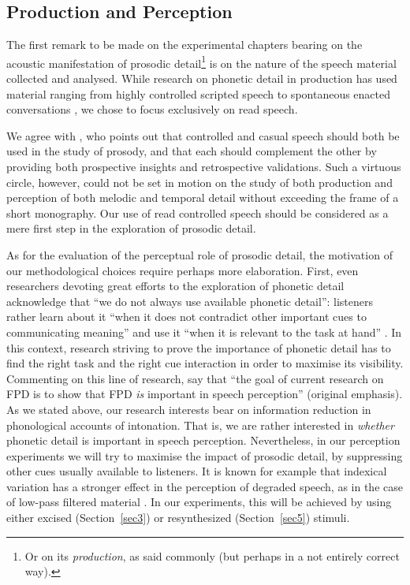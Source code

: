 \subsection{Production and Perception}\label{sec131}
The first remark to be made on the experimental chapters bearing on the acoustic manifestation of prosodic detail\footnote{Or on its \textit{production}, as said commonly (but perhaps in a not entirely correct way).} is on the nature of the speech material collected and analysed. While research on phonetic detail in production has used material ranging from highly controlled scripted speech to spontaneous enacted conversations \citep{beckman1997typology}, we chose to focus exclusively on read speech. 

We agree with \citet{gilifivela2008intonation}, who points out that controlled and casual speech should both be used in the study of prosody, and that each should complement the other by providing both prospective insights and retrospective validations. Such a virtuous circle, however, could not be set in motion on the study of both production and perception of both melodic and temporal detail without exceeding the frame of a short monography. Our use of read controlled speech should be considered as a mere first step in the exploration of prosodic detail.

As for the evaluation of the perceptual role of prosodic detail, the motivation of our methodological choices require perhaps more elaboration. First, even researchers devoting great efforts to the exploration of phonetic detail acknowledge that ``we do not always use available phonetic detail'': listeners rather learn about it ``when it does not contradict other important cues to communicating meaning'' and use it ``when it is relevant to the task at hand'' \cite[9]{hawkins2011phonetic}. In this context, research striving to prove the importance of phonetic detail has to find the right task and the right cue interaction in order to maximise its visibility. Commenting on this line of research, \citet[8]{nguyen2009dynamical} say that ``the goal of current research on FPD is to show that FPD \textit{is} important in speech perception'' (original emphasis). As we stated above, our research interests bear on information reduction in phonological accounts of intonation. That is, we are rather interested in \textit{whether} phonetic detail is important in speech perception. Nevertheless, in our perception experiments we will try to maximise the impact of prosodic detail, by suppressing other cues usually available to listeners. It is known for example that indexical variation has a stronger effect in the perception of degraded speech, as in the case of low-pass filtered material \citep{church1994perceptual}. In our experiments, this will be achieved by using either excised (Section~\ref{sec3}) or resynthesized (Section~\ref{sec5}) stimuli.


